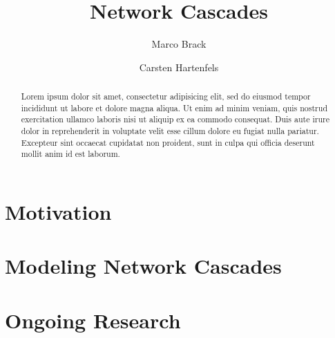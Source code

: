 \documentclass{article}
\begin{document}
\title{Network Cascades}
\author{Marco Brack \and Carsten Hartenfels}
\maketitle

\begin{abstract}
  Lorem ipsum dolor sit amet, consectetur adipisicing elit, sed do eiusmod tempor incididunt ut labore et dolore magna aliqua. Ut enim ad minim veniam, quis nostrud exercitation ullamco laboris nisi ut aliquip ex ea commodo consequat. Duis aute irure dolor in reprehenderit in voluptate velit esse cillum dolore eu fugiat nulla pariatur. Excepteur sint occaecat cupidatat non proident, sunt in culpa qui officia deserunt mollit anim id est laborum. \cite{simplemodel}
\end{abstract}

\section{Motivation}

\section{Modeling Network Cascades}

\section{Ongoing Research}



\end{document}

